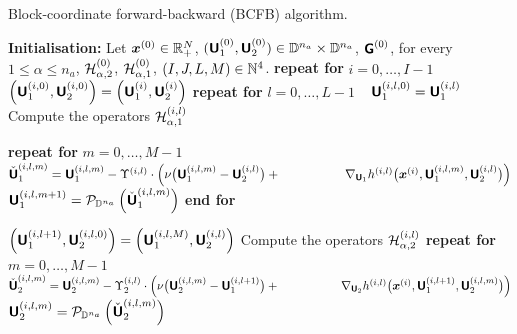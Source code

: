 \begin{algorithm}[]
\caption{Block-coordinate forward-backward (BCFB) algorithm.}\label{algo:VMBCFB}
\begin{algorithmic}[1] 
\footnotesize
\vspace*{0.1cm}
%
\State 
\textbf{Initialisation:}
Let $\boldsymbol{x}^{(0)} \in \mathbb{R}^N_{+} $, $(\boldsymbol{\mathsf{U}}_{1}^{(0)}, \boldsymbol{\mathsf{U}}_{2}^{(0)}) \in \mathbb{D}^{n_a} \times \mathbb{D}^{n_a}$, $\boldsymbol{\mathsf{G}}^{(0)}$, for every $1\leq\alpha \leq n_a$, $\mathcal{H}_{\alpha,2}^{(0)}$, $\mathcal{H}_{\alpha,1}^{(0)}$, $\left(I,J,L,M \right) \in \mathbb{N}^4$. 
\vspace*{0.2cm}
%
\State 
\textbf{repeat for} $i = 0,\dots, I-1 $ 
\vspace*{0.1cm}
%
\State 
\quad
$\left( \boldsymbol{\mathsf{U}}_{1}^{(i,0)} , \boldsymbol{\mathsf{U}}_{2}^{(i,0)}\right) = \left( \boldsymbol{\mathsf{U}}_{1}^{(i)}, \boldsymbol{\mathsf{U}}_{2}^{(i)}\right)$
\vspace*{0.15cm}
%
\State
\quad
\label{algo:step:startU}
{{{\textbf{repeat for} $l = 0, \ldots, L-1$} }}{~}
\vspace*{0.1cm}
%
\State
\quad\quad
$ \boldsymbol{\mathsf{U}}_{1}^{(i,l,0)}= \boldsymbol{\mathsf{U}}_{1}^{(i,l)}$
\vspace*{0.1cm}
%
\State
\quad\quad
Compute the operators $\mathcal{H}_{\alpha,1}^{(i,l)}$\label{algo:step:h1}
\vspace*{0.1cm}
%

\State
\quad\quad
\textbf{repeat for} $m = 0, \ldots, M-1${~}\label{algo:step:startu1}
\vspace*{0.1cm}
%
\State
\quad\quad\quad
\label{algo:gu1}
$\check{\boldsymbol{\mathsf{U}}}_1^{(i,l,m)} = \boldsymbol{\mathsf{U}}_1^{(i,l,m)}- \Upsilon^{(i,l)} \cdot \Big(  \nu \big( \boldsymbol{\mathsf{U}}_1^{(i,l,m)}-\boldsymbol{\mathsf{U}}_2^{(i,l)}\big) +{\hspace{1.8cm} \nabla_{\boldsymbol{\mathsf{U}}_1} {h}^{(i,l)} \big( \boldsymbol{x}^{(i)}, \boldsymbol{\mathsf{U}}_1^{(i,l,m)}, \boldsymbol{\mathsf{U}}_2^{(i,l)}\big) }\Big) $ \\
\quad\quad\quad
$\boldsymbol{\mathsf{U}}_1^{(i,l,m+1)} = \mathcal{P}_{\mathbb{D}^{n_a}} \left( \check{\boldsymbol{\mathsf{U}}}_1^{(i,l,m)} \right)$    
%
\State
\quad\quad
\textbf{end for}\label{algo:step:endu1}
\vspace*{0.1cm}

%
\State
\quad\quad
$\left( \boldsymbol{\mathsf{U}}_{1}^{(i,l+1)} , \boldsymbol{\mathsf{U}}_{2}^{(i,l,0)}\right) = \left( \boldsymbol{\mathsf{U}}_{1}^{(i,l,M)}, \boldsymbol{\mathsf{U}}_{2}^{(i,l)}\right)$
%
\State
\quad\quad
Compute the operators $\mathcal{H}_{\alpha,2}^{(i,l)}$\label{algo:step:h2}
\vspace*{0.1cm}
%
\State
\quad\quad
\textbf{repeat for} $m = 0, \ldots, M-1	${~}\label{algo:step:startu2}
\vspace*{0.1cm}
\State\label{algo:gu2}
\quad\quad\quad
$\check{\boldsymbol{\mathsf{U}}}_2^{(i,l,m)} = \boldsymbol{\mathsf{U}}_2^{(i,l,m)} -\Upsilon_2^{(i,l)} \cdot  \Big(  \nu \big( \boldsymbol{\mathsf{U}}_2^{(i,l,m)} - \boldsymbol{\mathsf{U}}_1^{(i,l+1)}\big) + {\hspace{1.8cm} \nabla_{\boldsymbol{\mathsf{U}}_2} {h}^{(i,l)} \big( \boldsymbol{x}^{(i)}, \boldsymbol{\mathsf{U}}_1^{(i,l+1)}, \boldsymbol{\mathsf{U}}_2^{(i,l,m)} \big)  } \Big)$ \\
\quad\quad\quad
$\boldsymbol{\mathsf{U}}_2^{(i,l,m)} = \mathcal{P}_{\mathbb{D}^{n_a}} \left( \check{\boldsymbol{\mathsf{U}}}_2^{(i,l,m)} \right) $ 
\vspace*{0.1cm}


\end{algorithmic}
\end{algorithm}

